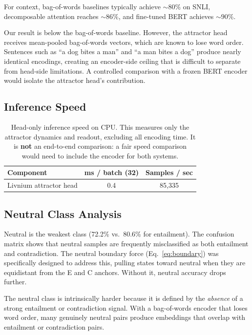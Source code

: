 \documentclass[11pt]{article}
\begin{document}
For context, bag-of-words baselines typically achieve ${\sim}80\%$ on
SNLI, decomposable attention \citep{parikh2016decomposable} reaches
${\sim}86\%$, and fine-tuned BERT \citep{devlin2019bert} achieves
${\sim}90\%$.

Our result is below the bag-of-words baseline. However, the attractor
head receives mean-pooled bag-of-words vectors, which are known to
lose word order. Sentences such as ``a dog bites a man'' and ``a man
bites a dog'' produce nearly identical encodings, creating an
encoder-side ceiling that is difficult to separate from head-side
limitations. A controlled comparison with a frozen BERT encoder would
isolate the attractor head's contribution.

\subsection{Inference Speed}

\begin{table}[ht]
\centering
\begin{tabular}{@{}lcc@{}}
\toprule
Component & ms / batch (32) & Samples / sec \\
\midrule
Livnium attractor head & 0.4 & 85,335 \\
\bottomrule
\end{tabular}
\caption{Head-only inference speed on CPU. This measures only the
attractor dynamics and readout, excluding all encoding time. It is
\textbf{not} an end-to-end comparison: a fair speed comparison would
need to include the encoder for both systems.}
\label{tab:speed}
\end{table}

\subsection{Neutral Class Analysis}

Neutral is the weakest class (72.2\% vs.\ 80.6\% for entailment).
The confusion matrix shows that neutral samples are frequently
misclassified as both entailment and contradiction. The neutral boundary
force (Eq.~\ref{eq:boundary}) was specifically designed to address this,
pulling states toward neutral when they are equidistant from the E and C
anchors. Without it, neutral accuracy drops further.

The neutral class is intrinsically harder because it is defined by
the \emph{absence} of a strong entailment or contradiction signal.
With a bag-of-words encoder that loses word order, many genuinely
neutral pairs produce embeddings that overlap with entailment or
contradiction pairs.
\end{document}
